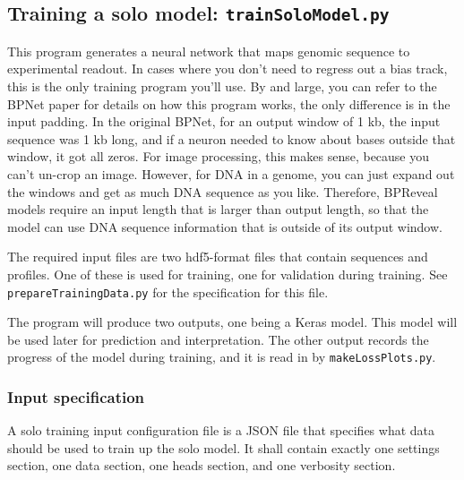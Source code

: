 \documentclass{article}
\begin{document}
\newpage


\subsection{Training a solo model: \texttt{trainSoloModel.py}}

This program generates a neural network that maps genomic sequence to experimental readout.
In cases where you don't need to regress out a bias track, this is the only training program
you'll use.
By and large, you can refer to the BPNet paper for details on how this program works, the only
difference is in the input padding.
In the original BPNet, for an output window of 1 kb, the input sequence was 1 kb long, and if
a neuron needed to know about bases outside that window, it got all zeros.
For image processing, this makes sense, because you can't un-crop an image. However, for DNA in
a genome, you can just expand out the windows and get as much DNA sequence as you like.
Therefore, BPReveal models require an input length that is larger than output length, so that
the model can use DNA sequence information that is outside of its output window.

The required input files are two hdf5-format files that contain sequences and profiles.
One of these is used for training, one for validation during training.
See \texttt{prepareTrainingData.py} for the specification for this file.

The program will produce two outputs, one being a Keras model. This model will be used later
for prediction and interpretation.
The other output records the progress of the model during training, and it is read in
by \texttt{makeLossPlots.py}.


\subsubsection{Input specification}

A solo training input configuration file is a JSON file that specifies what data should
be used to train up the solo model.
It shall contain exactly one settings section, one data section, one heads section,
and one verbosity section.
\end{document}
